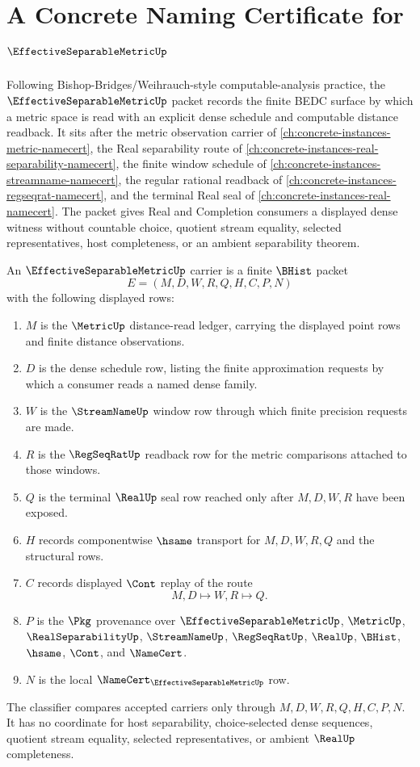 \chapter{A Concrete Naming Certificate for $\EffectiveSeparableMetricUp$}
\label{ch:concrete-instances-effective-separable-metric-namecert}

Following Bishop-Bridges/Weihrauch-style computable-analysis practice, the $\EffectiveSeparableMetricUp$ packet records the finite BEDC surface by which a metric space is read with an explicit dense schedule and computable distance readback. It sits after the metric observation carrier of \autoref{ch:concrete-instances-metric-namecert}, the Real separability route of \autoref{ch:concrete-instances-real-separability-namecert}, the finite window schedule of \autoref{ch:concrete-instances-streamname-namecert}, the regular rational readback of \autoref{ch:concrete-instances-regseqrat-namecert}, and the terminal Real seal of \autoref{ch:concrete-instances-real-namecert}. The packet gives Real and Completion consumers a displayed dense witness without countable choice, quotient stream equality, selected representatives, host completeness, or an ambient separability theorem.

\begin{definition}
\label{def:effective-separable-metric-carrier}
An $\EffectiveSeparableMetricUp$ carrier is a finite $\BHist$ packet
$$
E=(M,D,W,R,Q,H,C,P,N)
$$
with the following displayed rows:
\begin{enumerate}
\item $M$ is the $\MetricUp$ distance-read ledger, carrying the displayed point rows and finite distance observations.
\item $D$ is the dense schedule row, listing the finite approximation requests by which a consumer reads a named dense family.
\item $W$ is the $\StreamNameUp$ window row through which finite precision requests are made.
\item $R$ is the $\RegSeqRatUp$ readback row for the metric comparisons attached to those windows.
\item $Q$ is the terminal $\RealUp$ seal row reached only after $M,D,W,R$ have been exposed.
\item $H$ records componentwise $\hsame$ transport for $M,D,W,R,Q$ and the structural rows.
\item $C$ records displayed $\Cont$ replay of the route
$$
M,D \longmapsto W,R \longmapsto Q .
$$
\item $P$ is the $\Pkg$ provenance over $\EffectiveSeparableMetricUp$, $\MetricUp$, $\RealSeparabilityUp$, $\StreamNameUp$, $\RegSeqRatUp$, $\RealUp$, $\BHist$, $\hsame$, $\Cont$, and $\NameCert$.
\item $N$ is the local $\NameCert_{\EffectiveSeparableMetricUp}$ row.
\end{enumerate}
The classifier compares accepted carriers only through $M,D,W,R,Q,H,C,P,N$. It has no coordinate for host separability, choice-selected dense sequences, quotient stream equality, selected representatives, or ambient $\RealUp$ completeness.
\end{definition}

